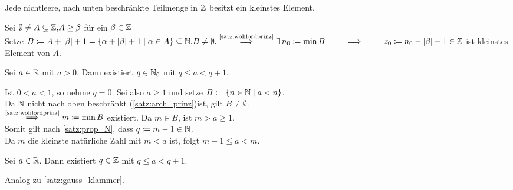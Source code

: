 \documentclass[../ana1.tex]{subfiles}
\begin{document}
\begin{kor}
	Jede nichtleere, nach unten beschränkte Teilmenge in \(\mathbb{Z} \) besitzt ein kleinstes Element.
\end{kor}
\begin{bew}
	Sei \(\emptyset \neq A \subsetneq \mathbb{Z} \text{,} A \geq \beta \) für ein \( \beta \in\mathbb{Z} \) \\
	Setze \(B \coloneqq A + \abs{\beta} + 1 = \set{\alpha + \abs{\beta} + 1 \; \vert \; \alpha \in A} \subseteq \N \ko B \neq \emptyset. \\
	\overset{\text{\autoref{satz:wohlordprinz}}}{\implies} \exists \, n_0 \coloneqq \min B\\
	\overset{\phantom{\text{\autoref{satz:wohlordprinz}}}}{\implies} z_0 \coloneqq n_0 - \abs{\beta} - 1 \in \Z \) ist kleinstes Element von \(A \).
\end{bew}

\begin{lem}\label{satz:gauss_klammer}
	Sei \( a \in\mathbb{R} \) mit \( a > 0 \). Dann existiert \(q \in \mathbb{N}_0 \) mit \(q \leq a < q + 1 \).
\end{lem}
\begin{bew}
	Ist \( 0 < a < 1 \), so nehme \( q = 0 \). Sei also \(a \geq 1 \) und setze \(B \coloneqq \{ n \in \mathbb{N} \; \vert \; a < n \} \). \\
	Da \( \mathbb{N} \) nicht nach oben beschränkt (\autoref{satz:arch_prinz})ist, gilt \(B \neq \emptyset \). \\
	\(\overset{\text{\autoref{satz:wohlordprinz}}}{\implies} m \coloneqq \min B \) existiert. Da \(m \in B \), ist \(m > a \geq 1 \). \\
	Somit gilt nach \autoref{satz:prop_N}, dass \(q\coloneqq m-1\in\mathbb{N} \).\\
	Da \( m \) die kleinste natürliche Zahl mit \(m < a \) ist, folgt \(m - 1 \leq a < m \).
\end{bew}

\begin{bem}
	Sei \(a \in \mathbb{R} \). Dann existiert \(q \in \mathbb{Z} \) mit \(q \leq a < q + 1 \).
\end{bem}
\begin{bew}
	Analog zu \autoref{satz:gauss_klammer}.
\end{bew}
\end{document}
